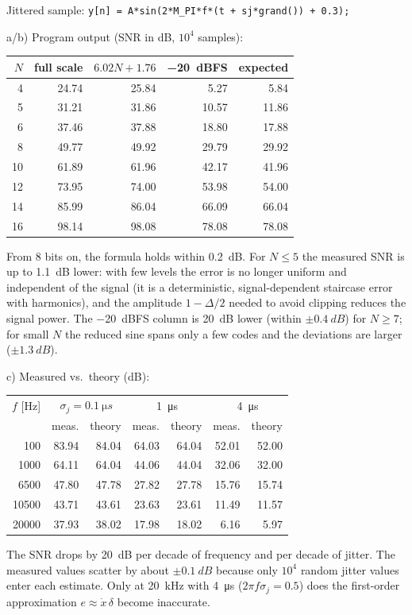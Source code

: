 \begin{solution}
Jittered sample: \lstinline|y[n] = A*sin(2*M_PI*f*(t + sj*grand()) + 0.3);|

a/b) Program output (SNR in dB, $10^4$ samples):
\begin{center}\small
\begin{tabular}{@{}rrrrr@{}}\toprule
$N$ & full scale & $6.02N+1.76$ & \SI{-20}{dBFS} & expected\\\midrule
4 & 24.74 & 25.84 & 5.27 & 5.84\\
5 & 31.21 & 31.86 & 10.57 & 11.86\\
6 & 37.46 & 37.88 & 18.80 & 17.88\\
8 & 49.77 & 49.92 & 29.79 & 29.92\\
10 & 61.89 & 61.96 & 42.17 & 41.96\\
12 & 73.95 & 74.00 & 53.98 & 54.00\\
14 & 85.99 & 86.04 & 66.09 & 66.04\\
16 & 98.14 & 98.08 & 78.08 & 78.08\\\bottomrule
\end{tabular}
\end{center}
From 8 bits on, the formula holds within \SI{0.2}{dB}. For $N\le5$ the
measured SNR is up to \SI{1.1}{dB} lower: with few levels the error is no
longer uniform and independent of the signal (it is a deterministic,
signal-dependent staircase error with harmonics), and the amplitude
$1-\Delta/2$ needed to avoid clipping reduces the signal power. The
\SI{-20}{dBFS} column is \SI{20}{dB} lower (within $\pm\SI{0.4}{dB}$) for $N\ge7$; for small $N$ the
reduced sine spans only a few codes and the deviations are larger
($\pm\SI{1.3}{dB}$).

c) Measured vs.\ theory (dB):
\begin{center}\small
\begin{tabular}{@{}r|rr|rr|rr@{}}\toprule
$f$ [Hz] & \multicolumn{2}{c|}{$\sigma_j=\SI{0.1}{\micro s}$} &
\multicolumn{2}{c|}{\SI{1}{\micro s}} & \multicolumn{2}{c}{\SI{4}{\micro s}}\\
 & meas. & theory & meas. & theory & meas. & theory\\\midrule
100   & 83.94 & 84.04 & 64.03 & 64.04 & 52.01 & 52.00\\
1000  & 64.11 & 64.04 & 44.06 & 44.04 & 32.06 & 32.00\\
6500  & 47.80 & 47.78 & 27.82 & 27.78 & 15.76 & 15.74\\
10500 & 43.71 & 43.61 & 23.63 & 23.61 & 11.49 & 11.57\\
20000 & 37.93 & 38.02 & 17.98 & 18.02 &  6.16 &  5.97\\\bottomrule
\end{tabular}
\end{center}
The SNR drops by \SI{20}{dB} per decade of frequency and per decade of
jitter. The measured values scatter by about $\pm\SI{0.1}{dB}$ because
only $10^4$ random jitter values enter each estimate. Only at \SI{20}{kHz}
with \SI{4}{\micro s} ($2\pi f\sigma_j=0.5$) does the first-order
approximation $e\approx\dot x\,\delta$ become inaccurate.


\end{solution}
